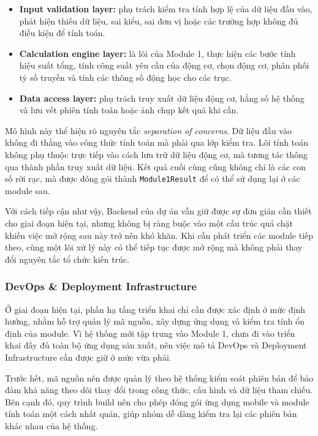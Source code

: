 \documentclass[a4paper]{article}
\begin{document}
\begin{itemize}
\item \textbf{Input validation layer:} phụ trách kiểm tra tính hợp lệ của dữ liệu đầu vào, phát hiện thiếu dữ liệu, sai kiểu, sai đơn vị hoặc các trường hợp không đủ điều kiện để tính toán.
\item \textbf{Calculation engine layer:} là lõi của Module 1, thực hiện các bước tính hiệu suất tổng, tính công suất yêu cầu của động cơ, chọn động cơ, phân phối tỷ số truyền và tính các thông số động học cho các trục.
\item \textbf{Data access layer:} phụ trách truy xuất dữ liệu động cơ, hằng số hệ thống và lưu vết phiên tính toán hoặc ảnh chụp kết quả khi cần.
\end{itemize}

Mô hình này thể hiện rõ nguyên tắc \textit{separation of concerns}. Dữ liệu đầu vào không đi thẳng vào công thức tính toán mà phải qua lớp kiểm tra. Lõi tính toán không phụ thuộc trực tiếp vào cách lưu trữ dữ liệu động cơ, mà tương tác thông qua thành phần truy xuất dữ liệu. Kết quả cuối cùng cũng không chỉ là các con số rời rạc, mà được đóng gói thành \texttt{Module1Result} để có thể sử dụng lại ở các module sau.

Với cách tiếp cận như vậy, Backend của dự án vẫn giữ được sự đơn giản cần thiết cho giai đoạn hiện tại, nhưng không bị ràng buộc vào một cấu trúc quá chặt khiến việc mở rộng sau này trở nên khó khăn. Khi cần phát triển các module tiếp theo, cùng một lõi xử lý này có thể tiếp tục được mở rộng mà không phải thay đổi nguyên tắc tổ chức kiến trúc.

\subsubsection{DevOps \& Deployment Infrastructure}

Ở giai đoạn hiện tại, phần hạ tầng triển khai chỉ cần được xác định ở mức định hướng, nhằm hỗ trợ quản lý mã nguồn, xây dựng ứng dụng và kiểm tra tính ổn định của module. Vì hệ thống mới tập trung vào Module 1, chưa đi vào triển khai đầy đủ toàn bộ ứng dụng sản xuất, nên việc mô tả DevOps và Deployment Infrastructure cần được giữ ở mức vừa phải.

Trước hết, mã nguồn nên được quản lý theo hệ thống kiểm soát phiên bản để bảo đảm khả năng theo dõi thay đổi trong công thức, cấu hình và dữ liệu tham chiếu. Bên cạnh đó, quy trình build nên cho phép đóng gói ứng dụng mobile và module tính toán một cách nhất quán, giúp nhóm dễ dàng kiểm tra lại các phiên bản khác nhau của hệ thống.
\end{document}
